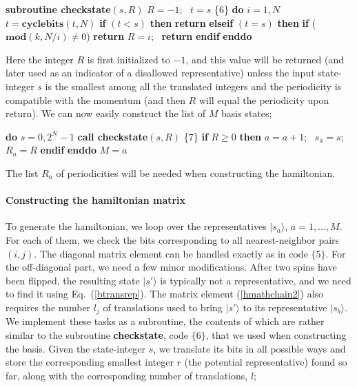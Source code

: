 \documentclass[draft,numberedheadings]{aipproc}
\newcommand{\code}{\null\vskip-2mm\noindent}
\newcommand{\br}{\hfill\break}
\newcommand{\cia}{\null\hskip5mm}
\newcommand{\cib}{\null\hskip10mm}
\newcommand{\cic}{\null\hskip15mm}
\begin{document}
{\code
\cia       {\bf subroutine checkstate}$(s,R)$ \br
\cia       $R=-1$;~ $t=s$                     \hfill \{6\}\break
\cia       {\bf do} $i=1,N$ \br
\cib          $t=\mathbf{cyclebits}(t,N)$ \br 
\cib          {\bf if} $(t<s)$ {\bf then} \br
\cic              {\bf return}  \br
\cib          {\bf elseif} $(t=s)$ {\bf then} \br
\cic              {\bf if} ($\mathbf{mod}(k,N/i)\not=0$) {\bf return} \br
\cic              $R=i$;~ {\bf return} \br
\cib          {\bf endif} \br
\cia       {\bf enddo} 
\code}

\noindent
Here the integer $R$ is first initialized to $-1$, and this value will be returned (and later used as an indicator of a disallowed representative) unless 
the input state-integer $s$ is the smallest among all the translated integers and the periodicity is compatible with the momentum (and then $R$ will equal 
the periodicity upon return). We can now easily construct the list of $M$ basis states;

{\code
\cia    {\bf do} $s=0,2^N-1$ \br
\cib       {\bf call checkstate}$(s,R)$                  \hfill \{7\}\break 
\cib       {\bf if} $R\ge 0$ {\bf then} $a=a+1$;~ $s_a=s$;~ $R_a=R$ {\bf endif} \br
\cia    {\bf enddo} \br
\cia    $M=a$ 
\code}

\noindent
The list $R_a$ of periodicities will be needed when constructing the hamiltonian.

\paragraph{Constructing the hamiltonian matrix}

To generate the hamiltonian, we loop over the representatives $|s_a\rangle$, $a=1,...,M$. For each of them, we check the bits corresponding to 
all nearest-neighbor pairs $(i,j)$. The diagonal matrix element can be handled exactly as in code $\{5\}$. For the off-diagonal part, we need 
a few minor modifications. After two spins have been flipped, the resulting state $|s'\rangle$ is typically not a representative, and we need to 
find it using Eq.~(\ref{btransrep}). The matrix element (\ref{hmathchain2}) also requires the number $l_j$ of translations used to bring $|s'\rangle$ 
to its representative $|s_b\rangle$. We implement these tasks as a subroutine, the contents of which are rather similar to the subroutine {\bf checkstate}, 
code $\{6\}$, that we used when constructing the basis. Given the state-integer $s$, we translate its bits in all possible ways and store the 
corresponding smallest integer $r$ (the potential representative) found so far, along with the corresponding number of translations, $l$;
\end{document}
